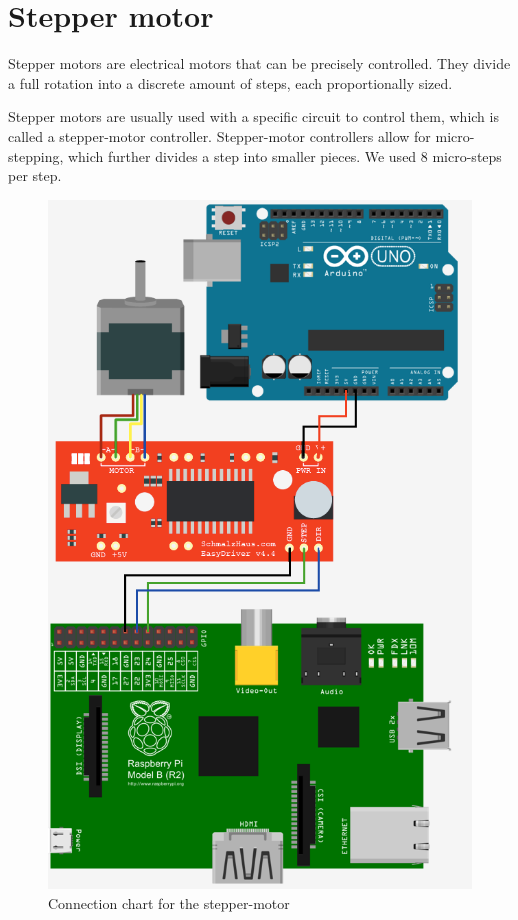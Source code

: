 \clearpage
\section{Stepper motor}
Stepper motors are electrical motors that can be precisely controlled. They divide a full rotation into a discrete amount of steps, each proportionally sized.

Stepper motors are usually used with a specific circuit to control them, which is called a stepper-motor controller. Stepper-motor controllers allow for micro-stepping, which further divides a step into smaller pieces. We used 8 micro-steps per step.

\begin{figure}[H]
	\centering
	\includegraphics[scale=.5]{images/steppermotor.png}
	\caption{Connection chart for the stepper-motor}
	\label{fig:steppermotor}
\end{figure}

